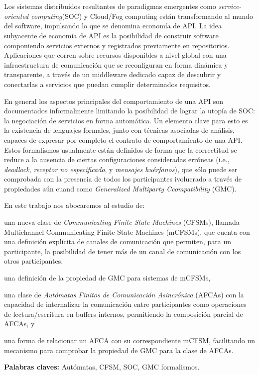 \chapter*{\runtitulo}

Los sistemas distribuidos resultantes de paradigmas emergentes como \emph{service-oriented computing}(SOC) y Cloud/Fog computing están transformando al mundo del software, impulsando lo que se denomina economía de API. La idea subyacente de economía de API es la posibilidad de construir software componiendo servicios externos y registrados previamente en repositorios. Aplicaciones que corren sobre recursos disponibles a nivel global con una infraestructura de comunicación que se reconfiguran en forma dinámica y transparente, a través de un middleware dedicado capaz de descubrir y conectarlas a servicios que puedan cumplir determinados requisitos. 

En general los aspectos principales del comportamiento de una API son documentados informalmente limitando la posibilidad de lograr la utopía de SOC: la negociación de servicios en forma automática. Un elemento clave para esto es la existencia de lenguajes formales, junto con técnicas asociadas de análisis, capaces de expresar por completo el contrato de comportamiento de una API. Estos formalismos usualmente están definidos de forma que la correctitud se reduce a la ausencia de ciertas configuraciones consideradas erróneas (i.e., \emph{deadlock}, \emph{receptor no especificado}, y \emph{mensajes huérfanos}), que sólo puede ser comprobada con la presencia de todos los participantes ivolucrado a través de propiedades aún cuand como \emph{Generalized Multiparty Ccompatibility} (GMC).

En este trabajo nos abocaremos al estudio de: 
\begin{inparaenum}[1)] 
\item una nueva clase de \emph{Communicating Finite State Machines} (CFSMs), llamada Multichannel Communicating Finite State Machines (mCFSMs), que cuenta con una definición explícita de canales de comunicación que permiten, para un participante, la posibilidad de tener más de un canal de comunicación con los otros participantes, 
\item una definición de la propiedad de GMC para sistemas de mCFSMs,
\item una clase de \emph{Autómatas Finitos de Comunicación Asincrónica} (AFCAs) con la capacidad de internalizar la comunicación entre participantes como operaciones de lectura/escritura en buffers internos, permitiendo la composición parcial de AFCAs, y
\item una forma de relacionar un AFCA con su correspondiente mCFSM, facilitando un mecanismo para comprobar la propiedad de GMC para la clase de AFCAs.
\end{inparaenum}

\bigskip

\noindent\textbf{Palabras claves:} Autómatas, CFSM, SOC, GMC formalismos.